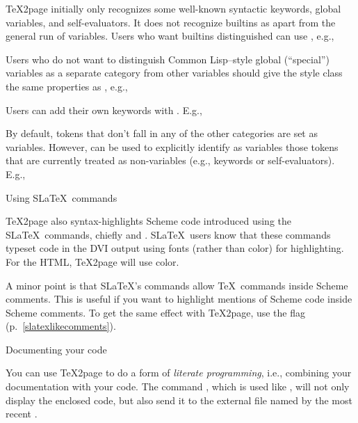 {{{{{{{{{{{{{{

\n \TeX2page initially only recognizes some well-known
syntactic keywords, global variables, and
self-evaluators.  It does not recognize builtins as
apart from the general run of variables.  Users who
want builtins distinguished can use
\p{\scmbuiltin}, e.g.,


Users who do not want to distinguish Common Lisp--style
global (``special'') variables as a separate category from
other variables should give the style class  the
same properties as , e.g.,


Users can add their own keywords with \p{\scmkeyword}.
E.g.,


By default, tokens that don't fall in any of the
other categories are set as variables.  However,
\p{\scmvariable} can be used to explicitly identify as
variables those tokens that are currently treated as
non-variables (e.g., keywords or self-evaluators).  E.g.,


\beginsection Using S\LaTeX\ commands

%
\TeX2page also syntax-highlights Scheme code introduced
using the S\LaTeX\ commands, chiefly
\p{\scheme} and .  S\LaTeX\ users know
that these commands typeset code in the DVI output
using fonts (rather than color) for highlighting.
For the HTML, \TeX2page will use color.

A minor point is that S\LaTeX's commands allow \TeX\
commands inside Scheme comments.  This is useful
if you want to highlight mentions of Scheme code inside
Scheme comments.  To get the same effect with \TeX2page,
use the \p{\TZPslatexcomments} flag (p.~\ref{slatexlikecomments}).

\beginsection Documenting your code

%
You can use \TeX2page to do a form of {\em literate
programming}, i.e., combining your documentation with
your code.  The command \p{\scmdribble}, which is used
like \p{\scm}, will not only display the enclosed code,
but also send it to the external file named by
the most recent \p{\verbwritefile}.

}}}}}}}}}}}}}}
